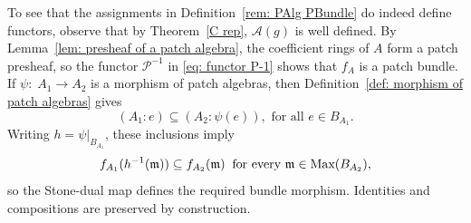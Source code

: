 \documentclass[11pt]{amsart}
\begin{document}
To see that the assignments in Definition~\ref{rem: PAlg PBundle} do indeed define functors, observe that by Theorem~\ref{C rep},  $\mathcal A(g)$ is well defined.
  By Lemma~\ref{lem: presheaf of a patch algebra}, the coefficient rings of $A$ form a patch presheaf, so the functor $\mathcal P^{-1}$ in \eqref{eq: functor P-1} shows that $f_A$ is a patch bundle.
If $\psi\colon\; A_1\to A_2$ is a morphism of patch algebras, then  Definition~\ref{def: morphism of patch algebras} gives
$$
(A_1:e)\subseteq(A_2:\psi(e)), {\mbox{ for all }} e\in B_{A_1}.
$$
 Writing $h=\psi|_{B_{A_1}}$, these inclusions imply
\[
f_{A_1}(h^{-1}(\mathfrak m))\subseteq f_{A_2}(\mathfrak m)
\:\text{ for every  }\mathfrak m\in\mbox{\rm Max}(B_{A_2}),
\]
so the Stone-dual map defines the required bundle morphism.
Identities and compositions are preserved by construction.
\end{document}
